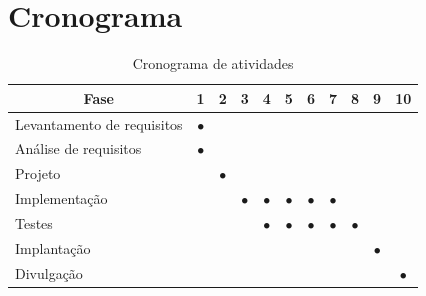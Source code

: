 \section{Cronograma}

\begin{table}[!htb]
	 \caption{Cronograma de atividades}
	 \label{tab:cronograma}
	 \begin{center}
		  \begin{tabular}{|l||c|c|c|c|c|c|c|c|c|c|}
			    \hline
			    \multicolumn{1}{|c||}{Fase} 	&1     			&2     			&3     			&4   			&5 				&6 			&7 			&8			&9				&10\\ \hline
			    Levantamento de requisitos 	& $\bullet$  	&           	&          		&         		&  				&  			&  			&			&	 			&\\
			    An\'alise de requisitos    	& $\bullet$     &  				& 				&         		&  				&  			&  			& 			&				&\\
			    Projeto   				   	&           	&$\bullet$    	& 				& 				&  				&  			&  			& 			&				&\\
			    Implementa\c{c}\~ao   	   	&           	&          		&$\bullet$   	&$\bullet$    	&$\bullet$		&$\bullet$ 	&$\bullet$ 	&			&				&\\
			    Testes    				   	&           	&           	& 				&$\bullet$ 		&$\bullet$ 		&$\bullet$ 	&$\bullet$  &$\bullet$	&				&\\
			    Implanta\c{c}\~ao    	   	&           	&           	&				& 				&  				&  			&  			&		 	&$\bullet$		&\\
			    Divulga\c{c}\~ao 		   	& 				& 				&				&				&				& 			&			& 			& 				&$\bullet$\\
			    \hline
			  \end{tabular}
		 \vspace{8pt} %
		 \end{center}
\end{table}